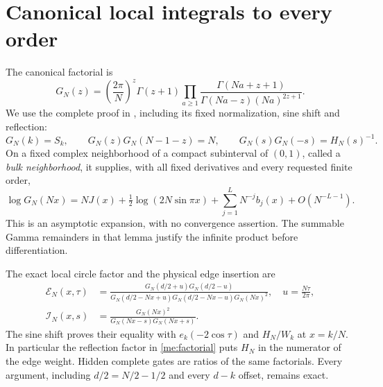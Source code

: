 \section{Canonical local integrals to every order}\label{me:local-orders}
The canonical factorial is
\begin{equation}\label{me:factorial}
 G_N(z)=\left(\frac{2\pi}{N}\right)^z\Gamma(z+1)
 \prod_{a\ge1}\frac{\Gamma(Na+z+1)}
                      {\Gamma(Na-z)(Na)^{2z+1}}.
\end{equation}
We use the complete proof in \cite[Lemma 2.1]{Asymptotics},
including its fixed normalization, sine shift and reflection:
\[
 G_N(k)=S_k,\qquad G_N(z)G_N(N-1-z)=N,
 \qquad G_N(s)G_N(-s)=H_N(s)^{-1}.
\]
On a fixed complex neighborhood of a compact subinterval of
$(0,1)$, called a \emph{bulk neighborhood}, it supplies, with all fixed
derivatives and every requested finite order,
\begin{equation}\label{me:factorial-expansion}
 \log G_N(Nx)=NJ(x)+\tfrac12\log(2N\sin\pi x)
           +\sum_{j=1}^{L}N^{-j}b_j(x)+O(N^{-L-1}).
\end{equation}
This is an asymptotic expansion, with no convergence assertion.
The summable Gamma remainders in that lemma justify the infinite
product before differentiation.

The exact local circle factor and the physical edge insertion are
\begin{align}
 \mathcal E_N(x,\tau)&=
 \frac{G_N(d/2+u)G_N(d/2-u)}
 {G_N(d/2-Nx+u)G_N(d/2-Nx-u)G_N(Nx)^2},
 \quad u=\frac{N\tau}{2\pi},\label{me:E}\\
 \mathcal I_N(x,s)&=\frac{G_N(Nx)^2}{G_N(Nx-s)G_N(Nx+s)}.
                                                        \label{me:I}
\end{align}
The sine shift proves their equality with
$e_k(-2\cos\tau)$ and $H_N/W_k$ at $x=k/N$.
In particular the reflection factor in \eqref{me:factorial} puts
$H_N$ in the numerator of the edge weight. Hidden complete gates
are ratios of the same factorials. Every argument, including
$d/2=N/2-1/2$ and every $d-k$ offset, remains exact.

